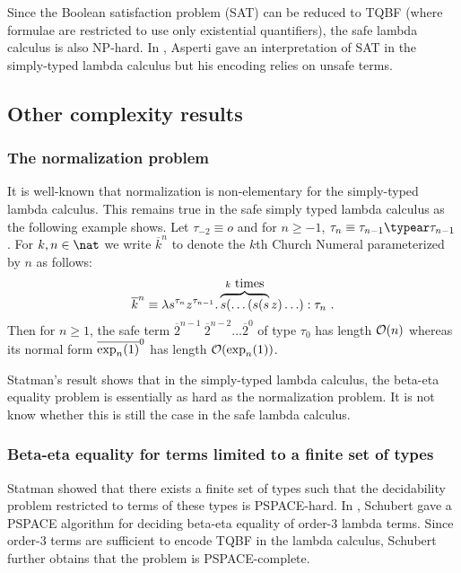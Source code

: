 \begin{remark}
Since the Boolean satisfaction problem (SAT) can be reduced to TQBF
(where formulae are restricted to use only existential quantifiers),
the safe lambda calculus is also NP-hard. In \cite{asperti-np},
Asperti gave an interpretation of SAT in the simply-typed lambda
calculus but his encoding relies on unsafe terms.
\end{remark}

\subsection{Other complexity results}


\subsubsection{The normalization problem}
It is well-known that normalization is non-elementary for the
simply-typed lambda calculus. This remains true in the safe simply
typed lambda calculus as the following example shows. Let $\tau_{-2}
\equiv o$ and for $n\geq -1$, $\tau_n \equiv \tau_{n-1}\typear
\tau_{n-1}$. For $k,n\in \nat$ we write $\overline{k}^n$ to denote
the $k$th Church Numeral parameterized by $n$ as follows:
$$\overline{k}^n \equiv \lambda s^{\tau_n}
z^{\tau_{n-1}} . \overbrace{s( \ldots (s (s}^{k\hbox{ times}}z)
\ldots) : \tau_n \ .$$ Then for $n\geq1$, the safe term
$\overline{2}^{n-1}~\overline{2}^{n-2}\ldots \overline{2}^0$ of type
$\tau_0$ has length $\mathcal{O}(n)$ whereas its normal form
$\overline{\exp_{n}(1)}^0$ has length $\mathcal{O}(\exp_{n}(1))$.

Statman's result shows that in the simply-typed lambda calculus, the
beta-eta equality problem is essentially as hard as the
normalization problem. It is not know whether this is still the case
in the safe lambda calculus.


\subsubsection{Beta-eta equality for terms limited to a finite set of types}
Statman showed \cite{Statman:1979:TLE} that there exists a finite
set of types such that the decidability problem restricted to terms
of these types is PSPACE-hard. In \cite{schubert2001cbr}, Schubert
gave a PSPACE algorithm for deciding beta-eta equality of order-$3$
lambda terms. Since order-$3$ terms are sufficient to encode TQBF in
the lambda calculus, Schubert further obtains that the problem is
PSPACE-complete.

